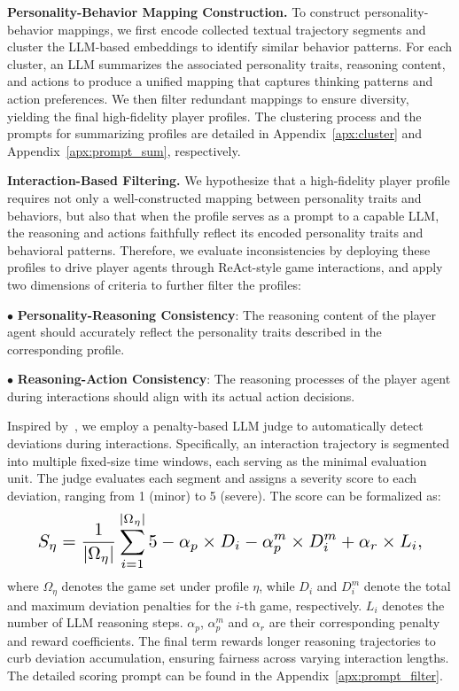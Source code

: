 \documentclass{article}
\theoremstyle{plain}
\theoremstyle{definition}
\theoremstyle{remark}
\begin{document}
\textbf{Personality-Behavior Mapping Construction.} To construct personality-behavior mappings, we first encode collected textual trajectory segments and cluster the LLM-based embeddings to identify similar behavior patterns. For each cluster, an LLM summarizes the associated personality traits, reasoning content, and actions to produce a unified mapping that captures thinking patterns and action preferences. We then filter redundant mappings to ensure diversity, yielding the final high-fidelity player profiles. The clustering process and the prompts for summarizing profiles are detailed in Appendix~\ref{apx:cluster} and Appendix~\ref{apx:prompt_sum}, respectively.



\textbf{Interaction-Based Filtering.} We hypothesize that a high-fidelity player profile requires not only a well-constructed mapping between personality traits and behaviors, but also that when the profile serves as a prompt to a capable LLM, the reasoning and actions faithfully reflect its encoded personality traits and behavioral patterns. Therefore, we evaluate inconsistencies by deploying these profiles to drive player agents through ReAct-style game interactions, and apply two dimensions of criteria to further filter the profiles:

$\bullet$ \textbf{Personality-Reasoning Consistency}: The reasoning content of the player agent should accurately reflect the personality traits described in the corresponding profile.

$\bullet$ \textbf{Reasoning-Action Consistency}: The reasoning processes of the player agent during interactions should align with its actual action decisions.


Inspired by~\cite{0001WZY00YGC00X25}, we employ a penalty-based LLM judge to automatically detect deviations during interactions. Specifically, an interaction trajectory is segmented into multiple fixed-size time windows, each serving as the minimal evaluation unit. The judge evaluates each segment and assigns a severity score to each deviation, ranging from 1 (minor) to 5 (severe). The score can be formalized as: 
\begin{equation}\label{eq:screen}
\resizebox{.90\linewidth}{!}{$
        \displaystyle
{S}_{\eta}=\frac{1}{| \Omega_{\eta} |}\sum_{i=1}^{| \Omega_{\eta} |}{5-\alpha_p\times {D}_i-\alpha_p^m\times {D}_{i}^{m}+\alpha_r\times {L}_i},
$}
\end{equation}
where $\Omega_{\eta}$ denotes the game set under profile $\eta$, while ${D}_i$ and ${D}^m_i$ denote the total and maximum deviation penalties for the $i$-th game, respectively. ${L}_i$ denotes the number of LLM reasoning steps. $\alpha_p$, $\alpha_p^m$ and $\alpha_r$ are their corresponding penalty and reward coefficients. The final term rewards longer reasoning trajectories to curb deviation accumulation, ensuring fairness across varying interaction lengths. The detailed scoring prompt can be found in the Appendix~\ref{apx:prompt_filter}.
\end{document}
